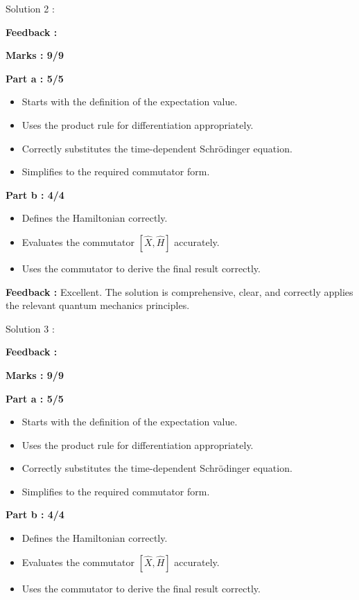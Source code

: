 \documentclass[a4paper,11pt]{article}
\begin{document}
Solution 2 :

\textbf{Feedback :}

\textbf{Marks : 9/9}

\textbf{Part a : 5/5}

\begin{itemize}
    \item Starts with the definition of the expectation value.
    \item Uses the product rule for differentiation appropriately.
    \item Correctly substitutes the time-dependent Schrödinger equation.
    \item Simplifies to the required commutator form.
\end{itemize}


\textbf{Part b : 4/4}

\begin{itemize}
    \item Defines the Hamiltonian correctly.
    \item Evaluates the commutator $[\hat{X}, \hat{H}]$ accurately.
    \item Uses the commutator to derive the final result correctly.
\end{itemize}

\textbf{Feedback :}
Excellent. The solution is comprehensive, clear, and correctly applies the relevant quantum mechanics principles.



Solution 3 :

\textbf{Feedback :}

\textbf{Marks : 9/9}

\textbf{Part a : 5/5}

\begin{itemize}
    \item Starts with the definition of the expectation value.
    \item Uses the product rule for differentiation appropriately.
    \item Correctly substitutes the time-dependent Schrödinger equation.
    \item Simplifies to the required commutator form.
\end{itemize}


\textbf{Part b : 4/4}

\begin{itemize}
    \item Defines the Hamiltonian correctly.
    \item Evaluates the commutator $[\hat{X}, \hat{H}]$ accurately.
    \item Uses the commutator to derive the final result correctly.
\end{itemize}
\end{document}
